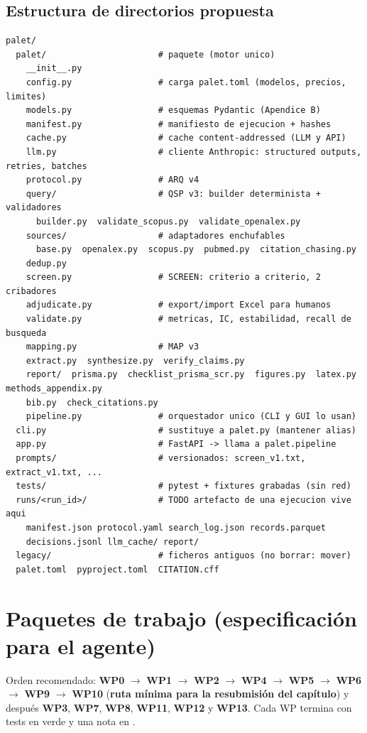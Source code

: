 \documentclass[11pt,a4paper]{article}
\newcommand{\WP}[1]{\textbf{\textcolor{palet}{WP#1}}}
\begin{document}
\subsection{Estructura de directorios propuesta}
\begin{lstlisting}
palet/
  palet/                      # paquete (motor unico)
    __init__.py
    config.py                 # carga palet.toml (modelos, precios, limites)
    models.py                 # esquemas Pydantic (Apendice B)
    manifest.py               # manifiesto de ejecucion + hashes
    cache.py                  # cache content-addressed (LLM y API)
    llm.py                    # cliente Anthropic: structured outputs, retries, batches
    protocol.py               # ARQ v4
    query/                    # QSP v3: builder determinista + validadores
      builder.py  validate_scopus.py  validate_openalex.py
    sources/                  # adaptadores enchufables
      base.py  openalex.py  scopus.py  pubmed.py  citation_chasing.py
    dedup.py
    screen.py                 # SCREEN: criterio a criterio, 2 cribadores
    adjudicate.py             # export/import Excel para humanos
    validate.py               # metricas, IC, estabilidad, recall de busqueda
    mapping.py                # MAP v3
    extract.py  synthesize.py  verify_claims.py
    report/  prisma.py  checklist_prisma_scr.py  figures.py  latex.py  methods_appendix.py
    bib.py  check_citations.py
    pipeline.py               # orquestador unico (CLI y GUI lo usan)
  cli.py                      # sustituye a palet.py (mantener alias)
  app.py                      # FastAPI -> llama a palet.pipeline
  prompts/                    # versionados: screen_v1.txt, extract_v1.txt, ...
  tests/                      # pytest + fixtures grabadas (sin red)
  runs/<run_id>/              # TODO artefacto de una ejecucion vive aqui
    manifest.json protocol.yaml search_log.json records.parquet
    decisions.jsonl llm_cache/ report/
  legacy/                     # ficheros antiguos (no borrar: mover)
  palet.toml  pyproject.toml  CITATION.cff
\end{lstlisting}

\section{Paquetes de trabajo (especificación para el agente)}\label{sec:wps}

Orden recomendado: \WP{0} $\to$ \WP{1} $\to$ \WP{2} $\to$ \WP{4} $\to$ \WP{5} $\to$ \WP{6} $\to$ \WP{9} $\to$ \WP{10} (\textbf{ruta mínima para la resubmisión del capítulo}) y después \WP{3}, \WP{7}, \WP{8}, \WP{11}, \WP{12} y \WP{13}. Cada WP termina con tests en verde y una nota en .
\end{document}
